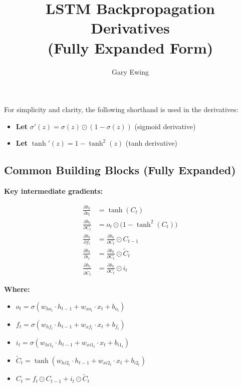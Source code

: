 \documentclass[12pt]{article}
\begin{document}
\title{LSTM Backpropagation Derivatives \\ (Fully Expanded Form)}
\author{Gary Ewing}
\date{}
\maketitle

For simplicity and clarity, the following shorthand is used in the derivatives:

\begin{itemize}[leftmargin=*]
    \item \textcolor{labelBlue}{\textbf{Let}} $\sigma'(z) = \sigma(z) \odot (1 - \sigma(z))$ \quad (sigmoid derivative)
    \item \textcolor{labelBlue}{\textbf{Let}} $\tanh'(z) = 1 - \tanh^2(z)$ \quad (tanh derivative)
\end{itemize}

\subsection*{Common Building Blocks (Fully Expanded)}

\textcolor{headingRed}{\textbf{Key intermediate gradients:}}

\begin{align*}
\frac{\partial h_t}{\partial o_t}   &= \tanh(C_t) \\
\frac{\partial h_t}{\partial C_t}   &= o_t \odot \bigl(1 - \tanh^2(C_t)\bigr) \\
\frac{\partial h_t}{\partial f_t}   &= \frac{\partial h_t}{\partial C_t} \odot C_{t-1} \\
\frac{\partial h_t}{\partial i_t}   &= \frac{\partial h_t}{\partial C_t} \odot \tilde{C}_t \\
\frac{\partial h_t}{\partial \tilde{C}_t} &= \frac{\partial h_t}{\partial C_t} \odot i_t
\end{align*}





\textcolor{headingRed}{\textbf{Where:}}

\begin{itemize}[leftmargin=*]
    \item $o_t = \sigma(w_{ho_t} \cdot h_{t-1} + w_{xo_t} \cdot x_t + b_{o_t})$
    \item $f_t = \sigma(w_{hf_t} \cdot h_{t-1} + w_{xf_t} \cdot x_t + b_{f_t})$
    \item $i_t = \sigma(w_{hi1_t} \cdot h_{t-1} + w_{xi1_t} \cdot x_t + b_{i1_t})$
    \item $\tilde{C}_t = \tanh(w_{hi2_t} \cdot h_{t-1} + w_{xi2_t} \cdot x_t + b_{i2_t})$
    \item $C_t = f_t \odot C_{t-1} + i_t \odot \tilde{C}_t$
\end{itemize}
\end{document}
